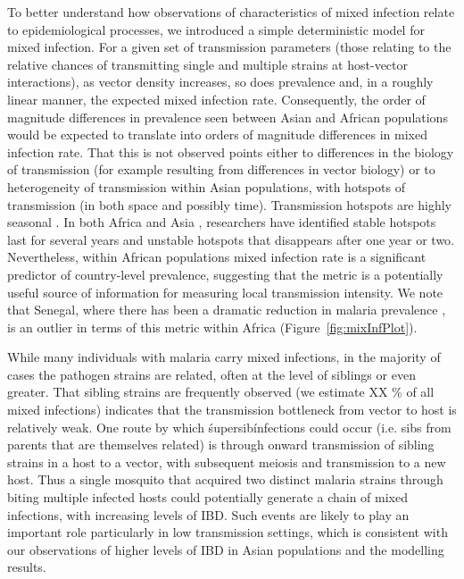 \documentclass[9pt,lineno]{elife}
\begin{document}
To better understand how observations of characteristics of mixed infection relate to epidemiological processes, we introduced a simple deterministic model for mixed infection.  For a given set of transmission parameters (those relating to the relative chances of transmitting single and multiple strains at host-vector interactions), as vector density increases, so does prevalence and, in a roughly linear manner, the expected mixed infection rate.  Consequently, the order of magnitude differences in prevalence seen between Asian and African populations would be expected to translate into orders of magnitude differences in mixed infection rate. That this is not observed points either to differences in the biology of transmission (for example resulting from differences in vector biology) or to heterogeneity of transmission within Asian populations, with hotspots of transmission (in both space and possibly time). Transmission hotspots are highly seasonal \citep{Ahmed2013}. In both Africa \citep{Bejon2010} and Asia \citep{Heng2017}, researchers have identified stable hotspots last for several years and unstable hotspots that disappears after one year or two. Nevertheless, within African populations mixed infection rate is a significant predictor of country-level prevalence, suggesting that the metric is a potentially useful source of information for measuring local transmission intensity.  We note that Senegal, where there has been a dramatic reduction in malaria prevalence \citep{Daniels2015}, is an outlier in terms of this metric within Africa (Figure~\ref{fig:mixInfPlot}).

While many individuals with malaria carry mixed infections, in the majority of cases the pathogen strains are related, often at the level of siblings or even greater.  That sibling strains are frequently observed (we estimate XX \% of all mixed infections) indicates that the transmission bottleneck from vector to host is relatively weak.  One route by which \'supersib\' infections could occur (i.e. sibs from parents that are themselves related) is through onward transmission of sibling strains in a host to a vector, with subsequent meiosis and transmission to a new host. Thus a single mosquito that acquired two distinct malaria strains through biting multiple infected hosts could potentially generate a chain of mixed infections, with increasing levels of IBD.  Such events are likely to play an important role particularly in low transmission settings, which is consistent with our observations of higher levels of IBD in Asian populations and the modelling results.
\end{document}
